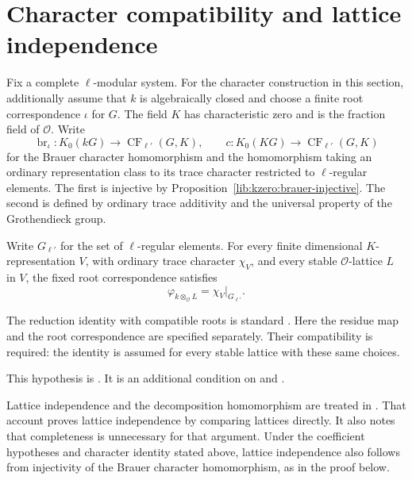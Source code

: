 \section{Character compatibility and lattice independence}
\label{lib:reduction:compatibility}

Fix a complete $\ell$-modular system. For the character construction in
this section, additionally assume that $k$ is algebraically closed and
choose a finite root correspondence $\iota$ for $G$. The field $K$ has
characteristic zero and is the fraction field of $\mathcal O$. Write
\[
 \operatorname{br}_{\iota}:K_0(kG)\longrightarrow
     \operatorname{CF}_{\ell'}(G,K),
 \qquad
 c:K_0(KG)\longrightarrow\operatorname{CF}_{\ell'}(G,K)
\]
for the Brauer character homomorphism and the homomorphism taking an
ordinary representation class to its trace character restricted to
$\ell$-regular elements. The first is injective by
Proposition~\ref{lib:kzero:brauer-injective}. The second is defined by
ordinary trace additivity and the universal property of the Grothendieck group.

\begin{hypothesis}
\label{lib:reduction:character-hypothesis}
Write $G_{\ell'}$ for the set of $\ell$-regular elements. For every finite
dimensional $K$-representation $V$, with ordinary trace character $\chi_V$,
and every stable $\mathcal O$-lattice $L$ in $V$, the fixed root
correspondence satisfies
\[
 \varphi_{k\otimes_{\mathcal O}L}
      =\chi_V\big|_{G_{\ell'}}.
\]
\end{hypothesis}

The reduction identity with compatible roots is standard
\cite[Corollary~2.9]{Navarro1998}.
Here the residue map and the root correspondence are specified
separately. Their compatibility is required: the identity is assumed
for every stable lattice with these same choices.

\begin{implementation}
This hypothesis is .
It is an additional condition on  and
.
\end{implementation}

Lattice independence and the decomposition homomorphism are treated in
\cite[\S15.2, Theorem~32 and the following discussion]{Serre1977}. That account proves lattice independence by
comparing lattices directly. It also notes that completeness is unnecessary
for that argument. Under the coefficient hypotheses and character identity
stated above, lattice independence also follows from injectivity of the
Brauer character homomorphism, as in the proof below.

